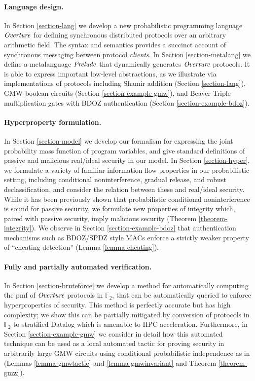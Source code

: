 \paragraph{Language design.} In Section \ref{section-lang} we
develop a new probabilistic programming language $\mathit{Overture}$ for
defining synchronous distributed protocols over an arbitrary
arithmetic field. The syntax and semantics provides a succinct account
of synchronous messaging between protocol \emph{clients}. In Section
\ref{section-metalang} we define a metalanguage $\mathit{Prelude}$ that
dynamically generates $\mathit{Overture}$ protocols. It is able to express
important low-level abstractions, as we illustrate via implementations
of protocols including Shamir addition (Section \ref{section-lang}),
GMW boolean circuits (Section \ref{section-example-gmw}), and Beaver
Triple multiplication gates with BDOZ authentication (Section
\ref{section-example-bdoz}).

\paragraph{Hyperproperty formulation.} In Section \ref{section-model} we
develop our formalism for expressing the joint probability mass function of
program variables, and give standard definitions of passive and
malicious real/ideal security in our model. In Section
\ref{section-hyper}, we formulate a variety of familiar information
flow properties in our probabilistic setting, including conditional
noninterference, gradual release, and robust declassification, and
consider the relation between these and real/ideal security.  While it
has been previously shown that probabilistic conditional
noninterference is sound for passive security, we formulate new
properties of integrity which, paired with passive security, imply
malicious security (Theorem \ref{theorem-integrity}). We observe
in Section \ref{section-example-bdoz} that authentication mechanisms
such as BDOZ/SPDZ style MACs enforce a strictly weaker property
of ``cheating detection'' (Lemma \ref{lemma-cheating}). 


\paragraph{Fully and partially automated verification.} In Section
\ref{section-bruteforce} we develop a method for automatically
computing the pmf of $\mathit{Overture}$ protocols in $\mathbb{F}_2$, that can
be automatically queried to enforce hyperproperties of
security. This method is perfectly accurate but has high complexity;
we show this can be partially mitigated by conversion of protocols in
$\mathbb{F}_2$ to stratified Datalog which is amenable to HPC
acceleration. Furthermore, in Section \ref{section-example-gmw} we
consider in detail how this automated technique can be used as a local
automated tactic for proving security in arbitrarily large GMW
circuits using conditional probabilistic independence as in
\cite{li2023lilac} (Lemmas \ref{lemma-gmwtactic} and \ref{lemma-gmwinvariant}
and Theorem \ref{theorem-gmw}).


